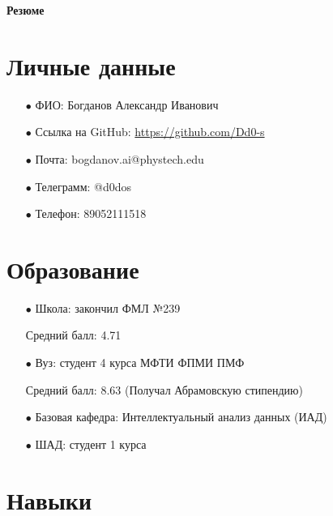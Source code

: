 \documentclass[a4paper,12pt]{article}
\begin{document}
 

\begin{center}
\Huge{\textbf{Резюме}}
\end{center}

\section*{Личные данные}

    \begin{enumerate}

        \item[$\bullet$] ФИО: Богданов Александр Иванович

        \item[$\bullet$] Ссылка на GitHub: \url{https://github.com/Dd0-s} 

        \item[$\bullet$] Почта: bogdanov.ai@phystech.edu

        \item[$\bullet$] Телеграмм: @d0dos

        \item[$\bullet$] Телефон: 89052111518

    \end{enumerate}

\section*{Образование}

    \begin{enumerate}

        \item[$\bullet$] Школа: закончил ФМЛ №239

        Средний балл: 4.71

        \item[$\bullet$] Вуз: студент 4 курса МФТИ ФПМИ ПМФ

        Средний балл: 8.63 (Получал Абрамовскую стипендию)

        \item[$\bullet$] Базовая кафедра: Интеллектуальный анализ данных (ИАД)

        \item[$\bullet$] ШАД: студент 1 курса

    \end{enumerate}

\section*{Навыки}
\end{document}
